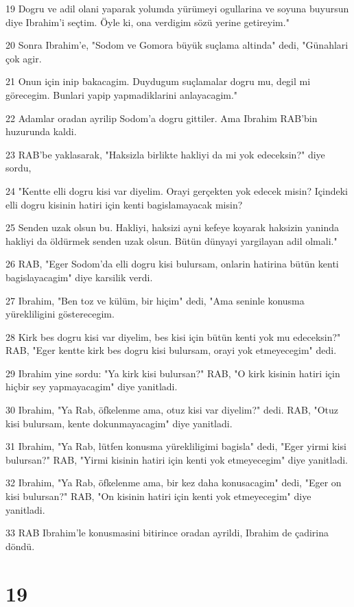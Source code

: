 \par 19 Dogru ve adil olani yaparak yolumda yürümeyi ogullarina ve soyuna buyursun diye Ibrahim'i seçtim. Öyle ki, ona verdigim sözü yerine getireyim."
\par 20 Sonra Ibrahim'e, "Sodom ve Gomora büyük suçlama altinda" dedi, "Günahlari çok agir.
\par 21 Onun için inip bakacagim. Duydugum suçlamalar dogru mu, degil mi görecegim. Bunlari yapip yapmadiklarini anlayacagim."
\par 22 Adamlar oradan ayrilip Sodom'a dogru gittiler. Ama Ibrahim RAB'bin huzurunda kaldi.
\par 23 RAB'be yaklasarak, "Haksizla birlikte hakliyi da mi yok edeceksin?" diye sordu,
\par 24 "Kentte elli dogru kisi var diyelim. Orayi gerçekten yok edecek misin? Içindeki elli dogru kisinin hatiri için kenti bagislamayacak misin?
\par 25 Senden uzak olsun bu. Hakliyi, haksizi ayni kefeye koyarak haksizin yaninda hakliyi da öldürmek senden uzak olsun. Bütün dünyayi yargilayan adil olmali."
\par 26 RAB, "Eger Sodom'da elli dogru kisi bulursam, onlarin hatirina bütün kenti bagislayacagim" diye karsilik verdi.
\par 27 Ibrahim, "Ben toz ve külüm, bir hiçim" dedi, "Ama seninle konusma yürekliligini gösterecegim.
\par 28 Kirk bes dogru kisi var diyelim, bes kisi için bütün kenti yok mu edeceksin?" RAB, "Eger kentte kirk bes dogru kisi bulursam, orayi yok etmeyecegim" dedi.
\par 29 Ibrahim yine sordu: "Ya kirk kisi bulursan?" RAB, "O kirk kisinin hatiri için hiçbir sey yapmayacagim" diye yanitladi.
\par 30 Ibrahim, "Ya Rab, öfkelenme ama, otuz kisi var diyelim?" dedi. RAB, "Otuz kisi bulursam, kente dokunmayacagim" diye yanitladi.
\par 31 Ibrahim, "Ya Rab, lütfen konusma yürekliligimi bagisla" dedi, "Eger yirmi kisi bulursan?" RAB, "Yirmi kisinin hatiri için kenti yok etmeyecegim" diye yanitladi.
\par 32 Ibrahim, "Ya Rab, öfkelenme ama, bir kez daha konusacagim" dedi, "Eger on kisi bulursan?" RAB, "On kisinin hatiri için kenti yok etmeyecegim" diye yanitladi.
\par 33 RAB Ibrahim'le konusmasini bitirince oradan ayrildi, Ibrahim de çadirina döndü.

\chapter{19}

